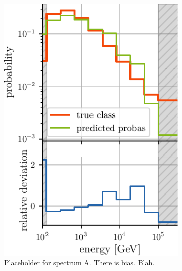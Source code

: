 \begin{figure}[H]
    \centering
    \begin{subfigure}{0.45\textwidth}
        \centering
        \includegraphics[width=\textwidth]{content/plots/bootstrap:spectrum_halfwidth.pdf}
        \caption{
            Placeholder for spectrum A.
            There is bias. Blah.
        }
    \end{subfigure}
    \begin{subfigure}{0.45\textwidth}
        \centering

\end{subfigure}
\end{figure}
